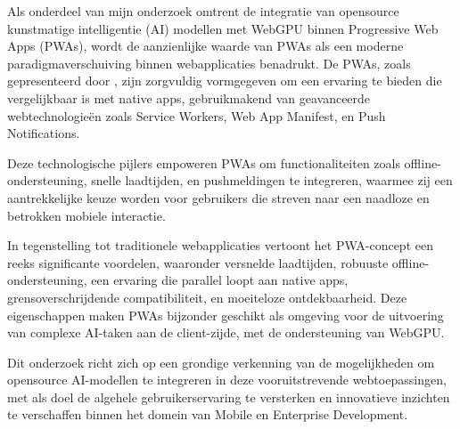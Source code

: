 



Als onderdeel van mijn onderzoek omtrent de integratie van opensource kunstmatige intelligentie (AI) 
modellen met WebGPU binnen Progressive Web Apps (PWAs), 
wordt de aanzienlijke waarde van PWAs als een moderne paradigmaverschuiving binnen webapplicaties benadrukt. 
De PWAs, zoals gepresenteerd door \textcite{Shumylo2023}, 
zijn zorgvuldig vormgegeven om een ervaring te bieden die vergelijkbaar is met native apps, 
gebruikmakend van geavanceerde webtechnologieën zoals Service Workers, Web App Manifest, en Push Notifications.

Deze technologische pijlers empoweren PWAs om functionaliteiten zoals offline-ondersteuning, 
snelle laadtijden, en pushmeldingen te integreren, 
waarmee zij een aantrekkelijke keuze worden voor gebruikers die streven naar een naadloze en betrokken mobiele interactie.

In tegenstelling tot traditionele webapplicaties vertoont het PWA-concept een reeks significante voordelen, 
waaronder versnelde laadtijden, 
robuuste offline-ondersteuning, een ervaring die parallel loopt aan native apps, 
grensoverschrijdende compatibiliteit, en moeiteloze ontdekbaarheid. 
Deze eigenschappen maken PWAs bijzonder geschikt als omgeving voor de uitvoering van complexe AI-taken aan de client-zijde, 
met de ondersteuning van WebGPU.

Dit onderzoek richt zich op een grondige verkenning van de mogelijkheden om opensource AI-modellen te integreren in deze vooruitstrevende webtoepassingen, 
met als doel de algehele gebruikerservaring te versterken en innovatieve inzichten te verschaffen binnen het domein van Mobile en Enterprise Development.


